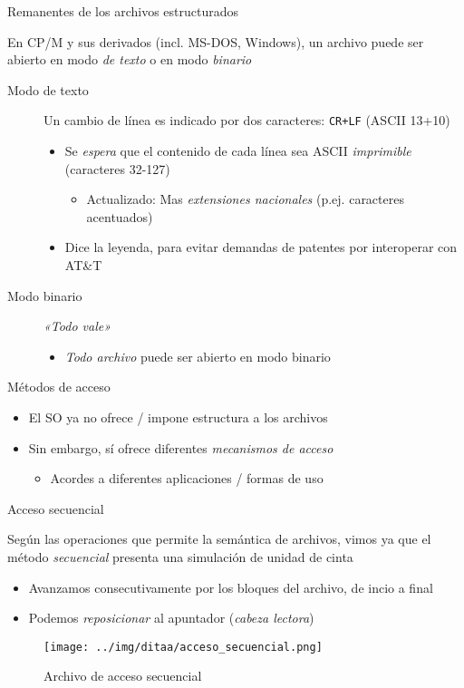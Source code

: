 \documentclass[presentation]{beamer}
\begin{document}
\begin{frame}[label={sec:orga0f18d4},fragile]{Remanentes de los archivos estructurados}
 \begin{center}
En CP/M y sus derivados (incl. MS-DOS, Windows), un archivo
puede ser abierto en modo \emph{de texto} o en modo \emph{binario}
\end{center}
\begin{description}
\item[{Modo de texto}] Un cambio de línea es indicado por dos caracteres:
\texttt{CR+LF} (ASCII 13+10)
\begin{itemize}
\item Se \emph{espera} que el contenido de cada línea sea ASCII \emph{imprimible}
(caracteres 32-127)
\begin{itemize}
\item Actualizado: Mas \emph{extensiones nacionales} (p.ej. caracteres
acentuados)
\end{itemize}
\item Dice la leyenda, para evitar demandas de patentes por interoperar con AT\&T
\end{itemize}
\item[{Modo binario}] \emph{«Todo vale»}
\begin{itemize}
\item \emph{Todo archivo} puede ser abierto en modo binario
\end{itemize}
\end{description}
\end{frame}

\begin{frame}[label={sec:org3a989fd}]{Métodos de acceso}
\begin{itemize}
\item El SO ya no ofrece / impone estructura a los archivos
\item Sin embargo, sí ofrece diferentes \emph{mecanismos de acceso}
\begin{itemize}
\item Acordes a diferentes aplicaciones / formas de uso
\end{itemize}
\end{itemize}
\end{frame}

\begin{frame}[label={sec:org37ce766}]{Acceso secuencial}
\begin{center}
Según las operaciones que permite la semántica de archivos, vimos ya
que el método \emph{secuencial} presenta una simulación de unidad de cinta
\end{center}
\begin{itemize}
\item Avanzamos consecutivamente por los bloques del archivo, de incio a
final
\item Podemos \emph{reposicionar} al apuntador (\emph{cabeza lectora})
\end{itemize}
\begin{figure}[htbp]
\centering
\texttt{[image: ../img/ditaa/acceso\_secuencial.png]}
\caption{Archivo de acceso secuencial}
\end{figure}
\end{frame}
\end{document}
